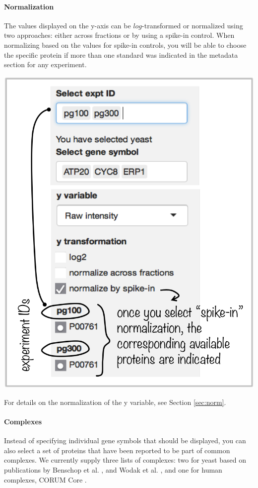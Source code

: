 \documentclass[letterpaper, twocolumn, 9pt]{article}
\begin{document}
\paragraph*{Normalization} The values displayed on the y-axis can be $log$-transformed or normalized using two approaches: either across fractions or by using a spike-in control.
When normalizing based on the values for spike-in controls, you will be able to choose the specific protein if more than one standard was indicated in the metadata section for any experiment.

\begin{center}
\includegraphics[width=.8\columnwidth]{figures/ss_indProt_normSpikeIn.png}
\end{center}

For details on the normalization of the y variable, see Section \ref{sec:norm}.

\paragraph*{Complexes} Instead of specifying individual gene symbols that should be displayed, you can also select a set of proteins that have been reported to be part of common complexes.
We currently supply three lists of complexes: two for yeast based on publications by Benschop et al. \citep{Benschop2010}, and Wodak et al. \citep{Wodak2009}, and one for human complexes, \textsf{CORUM Core} \citep{corum}.
\end{document}
